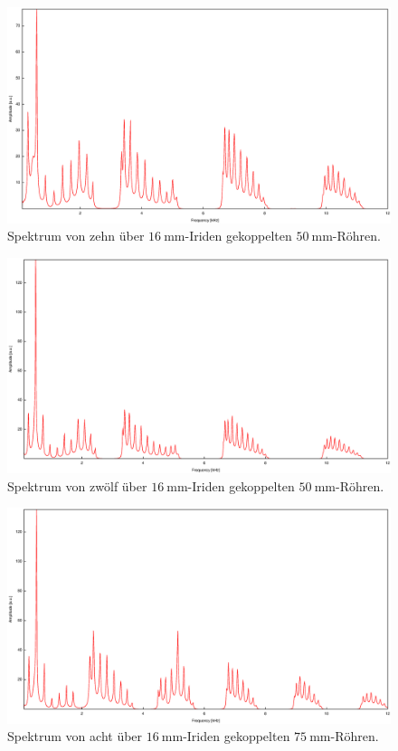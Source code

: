 \begin{figure}
\centering
\includegraphics[width=\linewidth-60pt,height=\textheight-60pt,keepaspectratio]{FP-V23data/4.4_500mm_16mm.eps}
\caption{Spektrum von zehn über $\SI{16}{\milli\meter}$-Iriden gekoppelten $\SI{50}{\milli\meter}$-Röhren.}
\label{fig:10_50_16}
\end{figure}

\begin{figure}
\centering
\includegraphics[width=\linewidth-60pt,height=\textheight-60pt,keepaspectratio]{FP-V23data/4.4_600mm_16mm.eps}
\caption{Spektrum von zwölf über $\SI{16}{\milli\meter}$-Iriden gekoppelten $\SI{50}{\milli\meter}$-Röhren.}
\label{fig:12_50_16}
\end{figure}

\begin{figure}
\centering
\includegraphics[width=\linewidth-60pt,height=\textheight-60pt,keepaspectratio]{FP-V23data/4.5_600mm_16mm.eps}
\caption{Spektrum von acht über $\SI{16}{\milli\meter}$-Iriden gekoppelten $\SI{75}{\milli\meter}$-Röhren.}
\label{fig:8_75_16}
\end{figure}

